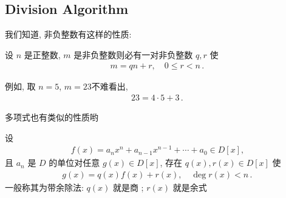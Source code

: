 \subsection*{Division Algorithm}

我们知道, 非负整数有这样的性质:

\begin{proposition}
    设 $n$ 是正整数, $m$ 是非负整数\period 则必有一对非负整数 $q,r$ 使
    \begin{align*}
        m = qn + r, \quad 0 \leq r < n \period
    \end{align*}
\end{proposition}

例如, 取 $n=5$, $m=23$\period 不难看出,
\begin{align*}
    23 = 4 \cdot 5 + 3 \period
\end{align*}

多项式也有类似的性质哟\period

\begin{proposition}
    设
    \begin{align*}
        f(x) = a_n x^n + a_{n-1} x^{n-1} + \cdots + a_0 \in D[x],
    \end{align*}
    且 $a_n$ 是 $D$ 的单位\period 对任意 $g(x) \in D[x]$, 存在 $q(x), r(x) \in D[x]$ 使
    \begin{align*}
        g(x) = q(x) f(x) + r(x), \quad \deg r(x) < n \period
    \end{align*}
    一般称其为带余除法: $q(x)$ 就是商 ; $r(x)$ 就是余式 \period
\end{proposition}


